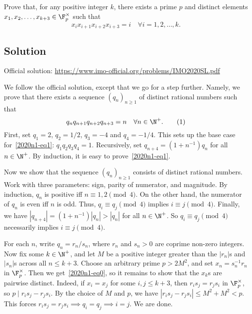 Prove that, for any positive integer $k$, there exists a prime $p$ and distinct elements $x_1, x_2, \ldots, x_{k + 3} \in \F_p^{\times}$ such that
\[ x_i x_{i + 1} x_{i + 2} x_{i + 3} = i \quad \forall i = 1, 2, \ldots, k. \tag{*}\label{2020n1-eq0} \]



\subsection*{Solution}

Official solution: \url{https://www.imo-official.org/problems/IMO2020SL.pdf}

We follow the official solution, except that we go for a step further.
Namely, we prove that there exists a sequence $(q_n)_{n \geq 1}$ of distinct rational numbers such that
\[ q_n q_{n + 1} q_{n + 2} q_{n + 3} = n \quad \forall n \in \N^+. \tag{1}\label{2020n1-eq1} \]
First, set $q_1 = 2$, $q_2 = 1/2$, $q_3 = -4$ and $q_4 = -1/4$.
This sets up the base case for~\eqref{2020n1-eq1}: $q_1 q_2 q_3 q_4 = 1$.
Recursively, set $q_{n + 4} = (1 + n^{-1}) q_n$ for all $n \in \N^+$.
By induction, it is easy to prove~\eqref{2020n1-eq1}.

Now we show that the sequence $(q_n)_{n \geq 1}$ consists of distinct rational numbers.
Work with three parameters: sign, parity of numerator, and magnitude.
By induction, $q_n$ is positive iff $n \equiv 1, 2 \pmod{4}$.
On the other hand, the numerator of $q_n$ is even iff $n$ is odd.
Thus, $q_i \equiv q_j \pmod{4}$ implies $i \equiv j \pmod{4}$.
Finally, we have $|q_{n + 4}| = (1 + n^{-1}) |q_n| > |q_n|$ for all $n \in \N^+$.
So $q_i \equiv q_j \pmod{4}$ necessarily implies $i \equiv j \pmod{4}$.

For each $n$, write $q_n = r_n/s_n$, where $r_n$ and $s_n > 0$ are coprime non-zero integers.
Now fix some $k \in \N^+$, and let $M$ be a positive integer greater than the $|r_n|$s and $|s_n|$s across all $n \leq k + 3$.
Choose an arbitrary prime $p > 2M^2$, and set $x_n = s_n^{-1} r_n$ in $\F_p^{\times}$.
Then we get~\eqref{2020n1-eq0}, so it remains to show that the $x_k$s are pairwise distinct.
Indeed, if $x_i = x_j$ for some $i, j \leq k + 3$, then $r_i s_j = r_j s_i$ in $\F_p^{\times}$, so $p \mid r_i s_j - r_j s_i$.
By the choice of $M$ and $p$, we have $|r_i s_j - r_j s_i| \leq M^2 + M^2 < p$.
This forces $r_i s_j = r_j s_i \implies q_i = q_j \implies i = j$.
We are done.
